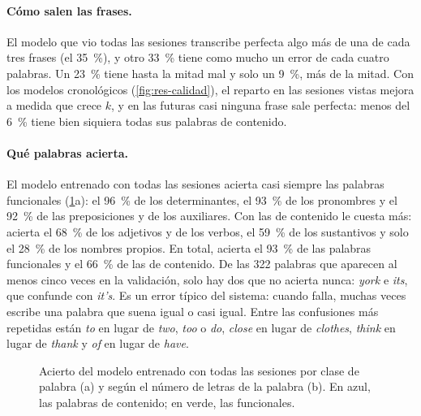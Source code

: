 \paragraph{Cómo salen las frases.} El modelo que vio todas las sesiones transcribe perfecta algo más de una de cada tres frases (el 35~\%), y otro 33~\% tiene como mucho un error de cada cuatro palabras. Un 23~\% tiene hasta la mitad mal y solo un 9~\%, más de la mitad. Con los modelos cronológicos (\cref{fig:res-calidad}), el reparto en las sesiones vistas mejora a medida que crece $k$, y en las futuras casi ninguna frase sale perfecta: menos del 6~\% tiene bien siquiera todas sus palabras de contenido.

\paragraph{Qué palabras acierta.} El modelo entrenado con todas las sesiones acierta casi siempre las palabras funcionales (\cref{fig:res-clases}a): el 96~\% de los determinantes, el 93~\% de los pronombres y el 92~\% de las preposiciones y de los auxiliares. Con las de contenido le cuesta más: acierta el 68~\% de los adjetivos y de los verbos, el 59~\% de los sustantivos y solo el 28~\% de los nombres propios. En total, acierta el 93~\% de las palabras funcionales y el 66~\% de las de contenido. De las 322 palabras que aparecen al menos cinco veces en la validación, solo hay dos que no acierta nunca: \textit{york} e \textit{its}, que confunde con \textit{it's}. Es un error típico del sistema: cuando falla, muchas veces escribe una palabra que suena igual o casi igual. Entre las confusiones más repetidas están \textit{to} en lugar de \textit{two}, \textit{too} o \textit{do}, \textit{close} en lugar de \textit{clothes}, \textit{think} en lugar de \textit{thank} y \textit{of} en lugar de \textit{have}.

\begin{figure}[htbp]
  \centering
  \caption[Acierto del modelo entrenado con todas las sesiones por clase de palabra (a) y según el número de letras de la palabra (b)]{Acierto del modelo entrenado con todas las sesiones por clase de palabra (a) y según el número de letras de la palabra (b). En azul, las palabras de contenido; en verde, las funcionales.}
  \label{fig:res-clases}
\end{figure}

